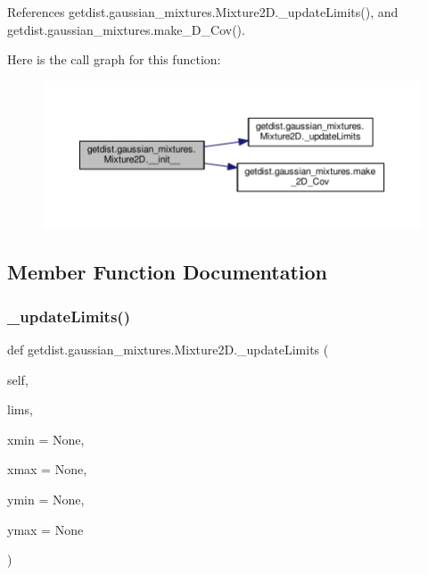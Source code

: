 References getdist.\+gaussian\+\_\+mixtures.\+Mixture2\+D.\+\_\+update\+Limits(), and getdist.\+gaussian\+\_\+mixtures.\+make\+\_\+D\+\_\+\+Cov().

Here is the call graph for this function\+:
\nopagebreak
\begin{figure}[H]
\begin{center}
\leavevmode
\includegraphics[width=350pt]{classgetdist_1_1gaussian__mixtures_1_1Mixture2D_a5c0e8c7249a06e98e239a4340efedd19_cgraph}
\end{center}
\end{figure}


\subsection{Member Function Documentation}
\mbox{\label{classgetdist_1_1gaussian__mixtures_1_1Mixture2D_a605ecb70ffec33463e92a7c475acd158}} 
\subsubsection{\texorpdfstring{\+\_\+update\+Limits()}{\_updateLimits()}}
{\footnotesize\ttfamily def getdist.\+gaussian\+\_\+mixtures.\+Mixture2\+D.\+\_\+update\+Limits (\begin{DoxyParamCaption}\item[{}]{self,  }\item[{}]{lims,  }\item[{}]{xmin = {\ttfamily None},  }\item[{}]{xmax = {\ttfamily None},  }\item[{}]{ymin = {\ttfamily None},  }\item[{}]{ymax = {\ttfamily None} }\end{DoxyParamCaption})\hspace{0.3cm}{\ttfamily [private]}}



